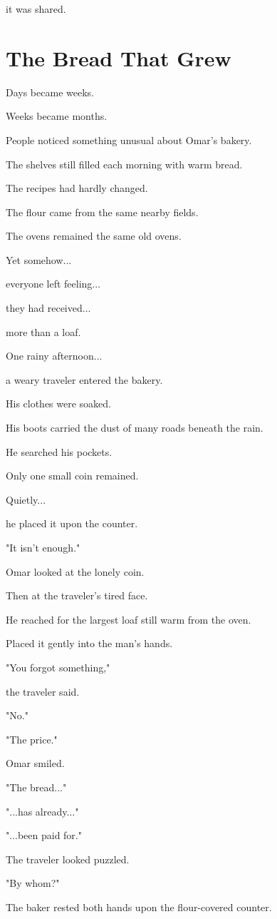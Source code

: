 \documentclass[12pt,openany]{book}
\begin{document}
it was shared.
\section*{The Bread That Grew}

Days became weeks.

Weeks became months.

People noticed something unusual about Omar's bakery.

The shelves still filled each morning with warm bread.

The recipes had hardly changed.

The flour came from the same nearby fields.

The ovens remained the same old ovens.

Yet somehow...

everyone left feeling...

they had received...

more than a loaf.

One rainy afternoon...

a weary traveler entered the bakery.

His clothes were soaked.

His boots carried the dust of many roads beneath the rain.

He searched his pockets.

Only one small coin remained.

Quietly...

he placed it upon the counter.

"It isn't enough."

Omar looked at the lonely coin.

Then at the traveler's tired face.

He reached for the largest loaf still warm from the oven.

Placed it gently into the man's hands.

"You forgot something,"

the traveler said.

"No."

"The price."

Omar smiled.

"The bread..."

"...has already..."

"...been paid for."

The traveler looked puzzled.

"By whom?"

The baker rested both hands upon the flour-covered counter.
\end{document}
